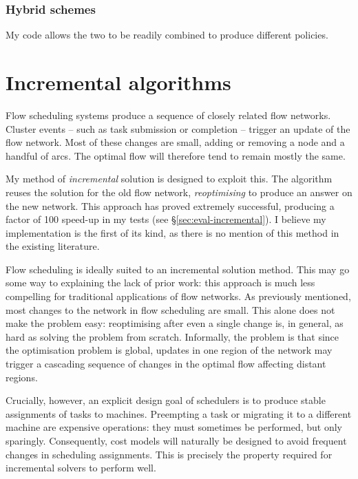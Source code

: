 \subsubsection{Hybrid schemes}

My code allows the two to be readily combined to produce different policies.

\section{Incremental algorithms} \label{sec:impl-incremental}

Flow scheduling systems produce a sequence of closely related flow networks. Cluster events -- such as task submission or completion -- trigger an update of the flow network. Most of these changes are small, adding or removing a node and a handful of arcs. The optimal flow will therefore tend to remain mostly the same. 

My method of \emph{incremental} solution is designed to exploit this. The algorithm reuses the solution for the old flow network, \emph{reoptimising} to produce an answer on the new network. This approach has proved extremely successful, producing a factor of 100 speed-up in my tests (see \S\ref{sec:eval-incremental}). I believe my implementation is the first of its kind, as there is no mention of this method in the existing literature.

Flow scheduling is ideally suited to an incremental solution method. This may go some way to explaining the lack of prior work: this approach is much less compelling for traditional applications of flow networks. As previously mentioned, most changes to the network in flow scheduling are small. This alone does not make the problem easy: reoptimising after even a single change is, in general, as hard as solving the problem from scratch\footnotemark. Informally, the problem is that since the optimisation problem is global, updates in one region of the network may trigger a cascading sequence of changes in the optimal flow affecting distant regions.

Crucially, however, an explicit design goal of schedulers is to produce stable assignments of tasks to machines. Preempting a task or migrating it to a different machine are expensive operations: they must sometimes be performed, but only sparingly. Consequently, cost models will naturally be designed to avoid frequent changes in scheduling assignments. This is precisely the property required for incremental solvers to perform well.

